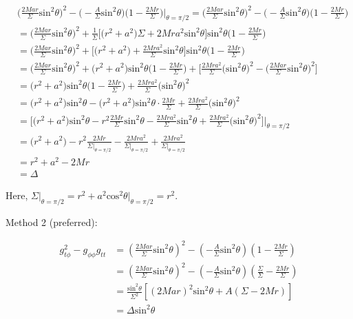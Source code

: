 \documentclass[english]{article}
\begin{document}
\begin{align*}
 & \biggl(\frac{2Mar}{\Sigma}\text{sin}^{2}\theta\biggr)^{2}-\biggl(-\frac{A}{\Sigma}\text{sin}^{2}\theta\biggr)\biggl(1-\frac{2Mr}{\Sigma}\biggr)\bigg|_{\theta=\pi/2}=\biggl(\frac{2Mar}{\Sigma}\text{sin}^{2}\theta\biggr)^{2}-\biggl(-\frac{A}{\Sigma}\text{sin}^{2}\theta\biggr)\biggl(1-\frac{2Mr}{\Sigma}\biggr)\\
 & =\biggl(\frac{2Mar}{\Sigma}\text{sin}^{2}\theta\biggr)^{2}+\frac{1}{\Sigma}\biggl[\biggl(r^{2}+a^{2}\biggr)\Sigma+2Mra^{2}\text{sin}^{2}\theta\biggr]\text{sin}^{2}\theta\biggl(1-\frac{2Mr}{\Sigma}\biggr)\\
 & =\biggl(\frac{2Mar}{\Sigma}\text{sin}^{2}\theta\biggr)^{2}+\biggl[\biggl(r^{2}+a^{2}\biggr)+\frac{2Mra^{2}}{\Sigma}\text{sin}^{2}\theta\biggr]\text{sin}^{2}\theta\biggl(1-\frac{2Mr}{\Sigma}\biggr)\\
 & =\biggl(\frac{2Mar}{\Sigma}\text{sin}^{2}\theta\biggr)^{2}+\biggl(r^{2}+a^{2}\biggr)\text{sin}^{2}\theta\biggl(1-\frac{2Mr}{\Sigma}\biggr)+\biggl[\frac{2Mra^{2}}{\Sigma}\biggl(\text{sin}^{2}\theta\biggr)^{2}-\biggl(\frac{2Mar}{\Sigma}\text{sin}^{2}\theta\biggr)^{2}\biggr]\\
 & =\biggl(r^{2}+a^{2}\biggr)\text{sin}^{2}\theta\biggl(1-\frac{2Mr}{\Sigma}\biggr)+\frac{2Mra^{2}}{\Sigma}\biggl(\text{sin}^{2}\theta\biggr)^{2}\\
 & =\biggl(r^{2}+a^{2}\biggr)\text{sin}^{2}\theta-\biggl(r^{2}+a^{2}\biggr)\text{sin}^{2}\theta\cdot\frac{2Mr}{\Sigma}+\frac{2Mra^{2}}{\Sigma}\biggl(\text{sin}^{2}\theta\biggr)^{2}\\
 & =\biggl[\biggl(r^{2}+a^{2}\biggr)\text{sin}^{2}\theta-r^{2}\frac{2Mr}{\Sigma}\text{sin}^{2}\theta-\frac{2Mra^{2}}{\Sigma}\text{sin}^{2}\theta+\frac{2Mra^{2}}{\Sigma}\biggl(\text{sin}^{2}\theta\biggr)^{2}\biggr]\bigg|_{\theta=\pi/2}\\
 & =\biggl(r^{2}+a^{2}\biggr)-r^{2}\frac{2Mr}{\Sigma|_{\theta=\pi/2}}-\frac{2Mra^{2}}{\Sigma|_{\theta=\pi/2}}+\frac{2Mra^{2}}{\Sigma|_{\theta=\pi/2}}\\
 & =r^{2}+a^{2}-2Mr\\
 & =\Delta
\end{align*}

Here, $\Sigma|_{\theta=\pi/2}=r^{2}+a^{2}\text{cos}^{2}\theta\Big|_{\theta=\pi/2}=r^{2}$.

Method 2 (preferred):

\begin{align*}
g^{2}_{t\phi}-g_{\phi\phi}g_{tt} & =\left(\frac{2Mar}{\Sigma}\text{sin}^{2}\theta\right)^{2}-\left(-\frac{A}{\Sigma}\text{sin}^{2}\theta\right)\left(1-\frac{2Mr}{\Sigma}\right)\\
 & =\left(\frac{2Mar}{\Sigma}\text{sin}^{2}\theta\right)^{2}-\left(-\frac{A}{\Sigma}\text{sin}^{2}\theta\right)\left(\frac{\Sigma}{\Sigma}-\frac{2Mr}{\Sigma}\right)\\
 & =\frac{\text{sin}^{2}\theta}{\Sigma^{2}}\left[\left(2Mar\right)^{2}\text{sin}^{2}\theta+A\left(\Sigma-2Mr\right)\right]\\
 & =\Delta\text{sin}^{2}\theta
\end{align*}
\end{document}

